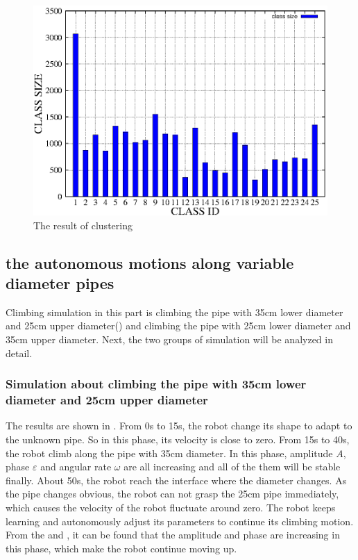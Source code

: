 \begin{figure}[t]
	\centering
	\includegraphics[width=0.7\linewidth]{fig/experiment/170912/cluster}
	\caption{The result of clustering}
\end{figure}

\subsection{the autonomous motions along variable diameter pipes}

Climbing simulation in this part is climbing the pipe with 35cm lower diameter and 25cm upper diameter() and climbing the pipe with 25cm lower diameter and 35cm upper diameter. Next, the two groups of simulation will be analyzed in detail.

\subsubsection{Simulation about climbing the pipe with 35cm lower diameter and 25cm upper diameter}

The results are shown in . From 0s to 15s, the robot change its shape to  adapt to the unknown pipe. So in this phase, its velocity is close to zero. From 15s to 40s, the robot climb along the pipe with 35cm diameter. In this phase, amplitude $A$, phase $\varepsilon$ and angular rate $\omega$ are all increasing and all of the them will be stable finally. About 50s, the robot reach the interface where the diameter changes. As the pipe changes obvious, the robot can not grasp the 25cm pipe immediately, which causes the velocity of the robot fluctuate around zero. The robot keeps learning and autonomously adjust its parameters to continue its climbing motion. From the  and , it can be found that the amplitude and phase are increasing in this phase, which make the robot continue moving up.

